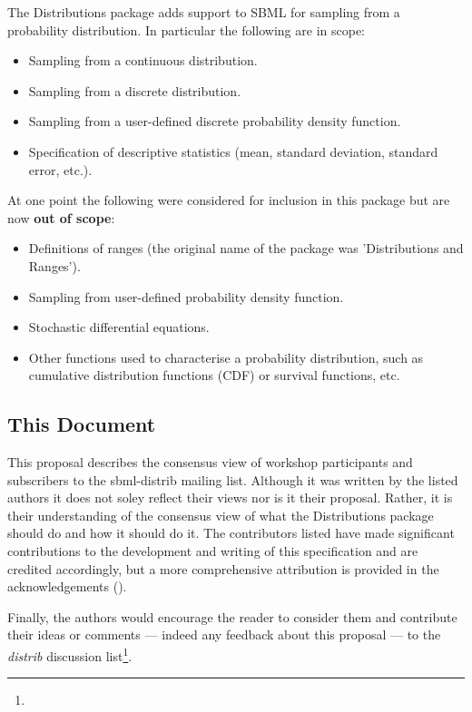 \documentclass[draftspec]{sbmlpkgspec}
\newcommand{\distribshort}{\emph{distrib}\xspace}
\newcommand{\distrib}{Distributions\xspace}
\begin{document}
The \distrib package adds support to SBML for sampling from a
probability distribution. In particular the following are in scope:

\begin{itemize}
\item Sampling from a continuous distribution.
\item Sampling from a discrete distribution.
\item Sampling from a user-defined discrete probability density function.
\item Specification of descriptive statistics (mean, standard
  deviation, standard error, etc.).
\end{itemize}

At one point the following were considered for inclusion in this
package but are now \textbf{out of scope}:

\begin{itemize}
\item Definitions of ranges (the original name of the package was 'Distributions and Ranges').
\item Sampling from user-defined probability density function.
\item Stochastic differential equations.
\item Other functions used to characterise a probability distribution,
  such as cumulative distribution functions (CDF) or survival functions, etc.
\end{itemize}

\subsection{This Document}

This proposal describes the consensus view of workshop participants
and subscribers to the sbml-distrib mailing list. Although it was
written by the listed authors it does not soley reflect their views nor is
it their proposal. Rather, it is their understanding of the consensus
view of what the \distrib package should do and how it should do
it. The contributors listed have made significant contributions to the
development and writing of this specification and are credited
accordingly, but a more comprehensive attribution is provided in the
acknowledgements ().

Finally, the authors would encourage the
reader to consider them and contribute their ideas or comments ---
indeed any feedback about this proposal --- to the \distribshort
discussion list\footnote{}.
\end{document}
